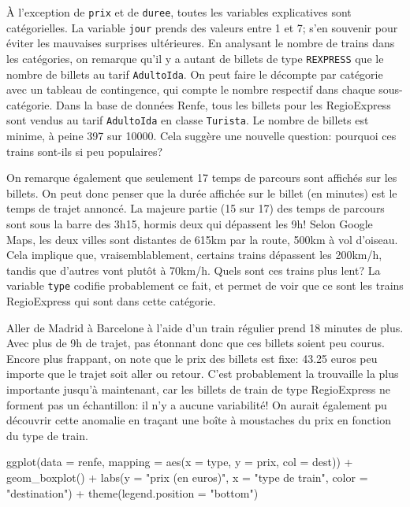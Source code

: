 \documentclass[
  11pt,
  letterpaper,
]{scrbook}
\newenvironment{Shaded}{\begin{snugshade}}{\end{snugshade}}
\newcommand{\AttributeTok}[1]{\textcolor[rgb]{0.40,0.45,0.13}{#1}}
\newcommand{\FunctionTok}[1]{\textcolor[rgb]{0.28,0.35,0.67}{#1}}
\newcommand{\NormalTok}[1]{\textcolor[rgb]{0.00,0.23,0.31}{#1}}
\newcommand{\SpecialCharTok}[1]{\textcolor[rgb]{0.37,0.37,0.37}{#1}}
\newcommand{\StringTok}[1]{\textcolor[rgb]{0.13,0.47,0.30}{#1}}
\theoremstyle{definition}
\theoremstyle{remark}
\begin{document}
À l'exception de \texttt{prix} et de \texttt{duree}, toutes les
variables explicatives sont catégorielles. La variable \texttt{jour}
prends des valeurs entre 1 et 7; s'en souvenir pour éviter les mauvaises
surprises ultérieures. En analysant le nombre de trains dans les
catégories, on remarque qu'il y a autant de billets de type
\texttt{REXPRESS} que le nombre de billets au tarif \texttt{AdultoIda}.
On peut faire le décompte par catégorie avec un tableau de contingence,
qui compte le nombre respectif dans chaque sous-catégorie. Dans la base
de données Renfe, tous les billets pour les RegioExpress sont vendus au
tarif \texttt{AdultoIda} en classe \texttt{Turista}. Le nombre de
billets est minime, à peine 397 sur 10000. Cela suggère une nouvelle
question: pourquoi ces trains sont-ils si peu populaires?

On remarque également que seulement 17 temps de parcours sont affichés
sur les billets. On peut donc penser que la durée affichée sur le billet
(en minutes) est le temps de trajet annoncé. La majeure partie (15 sur
17) des temps de parcours sont sous la barre des 3h15, hormis deux qui
dépassent les 9h! Selon Google Maps, les deux villes sont distantes de
615km par la route, 500km à vol d'oiseau. Cela implique que,
vraisemblablement, certains trains dépassent les 200km/h, tandis que
d'autres vont plutôt à 70km/h. Quels sont ces trains plus lent? La
variable \texttt{type} codifie probablement ce fait, et permet de voir
que ce sont les trains RegioExpress qui sont dans cette catégorie.

Aller de Madrid à Barcelone à l'aide d'un train régulier prend 18
minutes de plus. Avec plus de 9h de trajet, pas étonnant donc que ces
billets soient peu courus. Encore plus frappant, on note que le prix des
billets est fixe: 43.25 euros peu importe que le trajet soit aller ou
retour. C'est probablement la trouvaille la plus importante jusqu'à
maintenant, car les billets de train de type RegioExpress ne forment pas
un échantillon: il n'y a aucune variabilité! On aurait également pu
découvrir cette anomalie en traçant une boîte à moustaches du prix en
fonction du type de train.

\begin{Shaded}
\begin{Highlighting}[]
\FunctionTok{ggplot}\NormalTok{(}\AttributeTok{data =}\NormalTok{ renfe, }
       \AttributeTok{mapping =} \FunctionTok{aes}\NormalTok{(}\AttributeTok{x =}\NormalTok{ type, }\AttributeTok{y =}\NormalTok{ prix, }\AttributeTok{col =}\NormalTok{ dest)) }\SpecialCharTok{+} 
  \FunctionTok{geom\_boxplot}\NormalTok{() }\SpecialCharTok{+} 
  \FunctionTok{labs}\NormalTok{(}\AttributeTok{y =} \StringTok{"prix (en euros)"}\NormalTok{,}
       \AttributeTok{x =} \StringTok{"type de train"}\NormalTok{,}
       \AttributeTok{color =} \StringTok{"destination"}\NormalTok{) }\SpecialCharTok{+}
  \FunctionTok{theme}\NormalTok{(}\AttributeTok{legend.position =} \StringTok{"bottom"}\NormalTok{)}
\end{Highlighting}
\end{Shaded}
\end{document}
